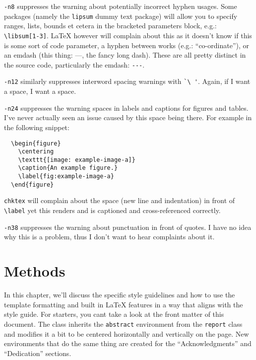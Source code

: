 \documentclass{thesis-dissertation}
\begin{document}
\texttt{-n8} suppresses the warning about potentially incorrect hyphen usages. Some packages (namely the \texttt{lipsum} dummy text package) will allow you to specify ranges, lists, bounds et cetera in the bracketed parameters block, e.g.: \verb|\libsum[1-3]|. \LaTeX{} however will complain about this as it doesn't know if this is some sort of code parameter, a hyphen between works (e.g.: ``co-ordinate''), or an emdash (this thing: ---, the fancy long dash). These are all pretty distinct in the source code, particularly the emdash: \verb|---|. 

\texttt{-n12} similarly suppresses interword spacing warnings with \verb|`\ '|. Again, if I want a space, I want a space.

\texttt{-n24} suppresses the warning spaces in labels and captions for figures and tables. I've never actually seen an issue caused by this space being there. For example in the following snippet:\begin{verbatim}
  \begin{figure}
    \centering
    \texttt{[image: example-image-a]}
    \caption{An example figure.}
    \label{fig:example-image-a}
  \end{figure}\end{verbatim}\texttt{chktex} will complain about the space (new line and indentation) in front of \verb|\label| yet this renders and is captioned and cross-referenced correctly.

\texttt{-n38} suppresses the warning about punctuation in front of quotes. I have no idea why this is a problem, thus I don't want to hear complaints about it.
\chapter{Methods}

In this chapter, we'll discuss the specific style guidelines and how to use the template formatting and built in \LaTeX{} features in a way that aligns with the style guide. For starters, you cant take a look at the front matter of this document. The class inherits the \texttt{abstract} environment from the \texttt{report} class and modifies it a bit to be centered horizontally and vertically on the page. New environments that do the same thing are created for the ``Acknowledgments'' and ``Dedication'' sections. 
\end{document}
